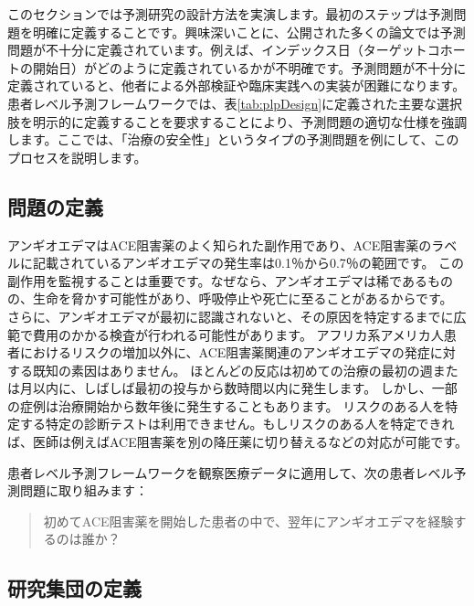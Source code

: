 \documentclass[
  11pt]{book}
\theoremstyle{definition}
\theoremstyle{definition}
\theoremstyle{definition}
\theoremstyle{definition}
\theoremstyle{remark}
\begin{document}
このセクションでは予測研究の設計方法を実演します。最初のステップは予測問題を明確に定義することです。興味深いことに、公開された多くの論文では予測問題が不十分に定義されています。例えば、インデックス日（ターゲットコホートの開始日）がどのように定義されているかが不明確です。予測問題が不十分に定義されていると、他者による外部検証や臨床実践への実装が困難になります。患者レベル予測フレームワークでは、表\ref{tab:plpDesign}に定義された主要な選択肢を明示的に定義することを要求することにより、予測問題の適切な仕様を強調します。ここでは、「治療の安全性」というタイプの予測問題を例にして、このプロセスを説明します。 

\subsection{問題の定義}\label{ux554fux984cux306eux5b9aux7fa9-2}

アンギオエデマはACE阻害薬のよく知られた副作用であり、ACE阻害薬のラベルに記載されているアンギオエデマの発生率は0.1％から0.7％の範囲です。\citep{byrd_2006} この副作用を監視することは重要です。なぜなら、アンギオエデマは稀であるものの、生命を脅かす可能性があり、呼吸停止や死亡に至ることがあるからです。\citep{norman_2013} さらに、アンギオエデマが最初に認識されないと、その原因を特定するまでに広範で費用のかかる検査が行われる可能性があります。\citep{norman_2013, thompson_1993} アフリカ系アメリカ人患者におけるリスクの増加以外に、ACE阻害薬関連のアンギオエデマの発症に対する既知の素因はありません。\citep{byrd_2006} ほとんどの反応は初めての治療の最初の週または月以内に、しばしば最初の投与から数時間以内に発生します。\citep{circardi_2004} しかし、一部の症例は治療開始から数年後に発生することもあります。\citep{mara_1996} リスクのある人を特定する特定の診断テストは利用できません。もしリスクのある人を特定できれば、医師は例えばACE阻害薬を別の降圧薬に切り替えるなどの対応が可能です。  

患者レベル予測フレームワークを観察医療データに適用して、次の患者レベル予測問題に取り組みます：

\begin{quote}
初めてACE阻害薬を開始した患者の中で、翌年にアンギオエデマを経験するのは誰か？
\end{quote}

\subsection{研究集団の定義}\label{ux7814ux7a76ux96c6ux56e3ux306eux5b9aux7fa9-1}
\end{document}

